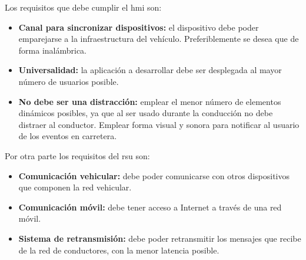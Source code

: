 Los requisitos que debe cumplir el \gls{hmi} son:
\begin{itemize}
	\item \textbf{Canal para sincronizar dispositivos:} el dispositivo debe poder emparejarse a la
	infraestructura del vehículo. Preferiblemente se desea que de forma inalámbrica.
	
	\item \textbf{Universalidad:} la aplicación a desarrollar debe ser desplegada al mayor número
	de usuarios posible.
	
	\item \textbf{No debe ser una distracción:} emplear el menor número de elementos dinámicos
	posibles, ya que al ser usado durante la conducción no debe distraer al conductor. Emplear
	forma visual y sonora para notificar al usuario de los eventos en carretera.
\end{itemize}

Por otra parte los requisitos del \gls{rsu} son:
\begin{itemize}
	\item \textbf{Comunicación vehicular:} debe poder comunicarse con otros dispositivos que
	componen la red vehicular.
	
	\item \textbf{Comunicación móvil:} debe tener acceso a Internet a través de una red móvil.
	
	\item \textbf{Sistema de retransmisión:} debe poder retransmitir los mensajes que recibe de
	la red de conductores, con la menor latencia posible.
\end{itemize}

